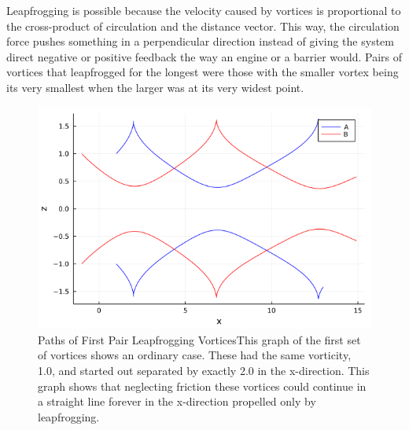\documentclass{article}
\begin{document}
Leapfrogging is possible because the velocity caused by vortices is proportional to the cross-product of circulation and the distance vector. This way, the circulation force pushes something in a perpendicular direction instead of giving the system direct negative or positive feedback the way an engine or a barrier would. Pairs of vortices that leapfrogged for the longest were those with the smaller vortex being its very smallest when the larger was at its very widest point.\newline

\begin{figure}[htb]
	\centering
	\includegraphics[width=\textwidth]{Graph_A.png}
	\caption{Paths of First Pair Leapfrogging Vortices\newline     This graph of the first set of vortices shows an ordinary case. These had the same vorticity, 1.0, and started out separated by exactly 2.0 in the x-direction. This graph shows that neglecting friction these vortices could continue in a straight line forever in the x-direction propelled only by leapfrogging.}
	\label{fig:vortexpaths}
\end{figure} 
\end{document}
